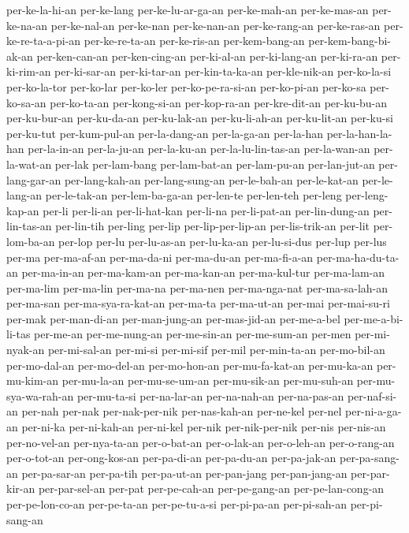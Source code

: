 {per-ke-la-hi-an per-ke-lang per-ke-lu-ar-ga-an per-ke-mah-an per-ke-mas-an
per-ke-na-an per-ke-nal-an per-ke-nan per-ke-nan-an per-ke-rang-an
per-ke-ras-an per-ke-re-ta-a-pi-an per-ke-re-ta-an per-ke-ris-an
per-kem-bang-an per-kem-bang-bi-ak-an per-ken-can-an per-ken-cing-an
per-ki-al-an per-ki-lang-an per-ki-ra-an per-ki-rim-an per-ki-sar-an
per-ki-tar-an per-kin-ta-ka-an per-kle-nik-an per-ko-la-si per-ko-la-tor
per-ko-lar per-ko-ler per-ko-pe-ra-si-an per-ko-pi-an per-ko-sa
per-ko-sa-an per-ko-ta-an per-kong-si-an per-kop-ra-an per-kre-dit-an
per-ku-bu-an per-ku-bur-an per-ku-da-an per-ku-lak-an per-ku-li-ah-an
per-ku-lit-an per-ku-si per-ku-tut per-kum-pul-an per-la-dang-an
per-la-ga-an per-la-han per-la-han-la-han per-la-in-an per-la-ju-an
per-la-ku-an per-la-lu-lin-tas-an per-la-wan-an per-la-wat-an per-lak
per-lam-bang per-lam-bat-an per-lam-pu-an per-lan-jut-an per-lang-gar-an
per-lang-kah-an per-lang-sung-an per-le-bah-an per-le-kat-an
per-le-lang-an per-le-tak-an per-lem-ba-ga-an per-len-te per-len-teh
per-leng per-leng-kap-an per-li per-li-an per-li-hat-kan per-li-na
per-li-pat-an per-lin-dung-an per-lin-tas-an per-lin-tih per-ling per-lip
per-lip-per-lip-an per-lis-trik-an per-lit per-lom-ba-an per-lop per-lu
per-lu-as-an per-lu-ka-an per-lu-si-dus per-lup per-lus per-ma
per-ma-af-an per-ma-da-ni per-ma-du-an per-ma-fi-a-an per-ma-ha-du-ta-an
per-ma-in-an per-ma-kam-an per-ma-kan-an per-ma-kul-tur per-ma-lam-an
per-ma-lim per-ma-lin per-ma-na per-ma-nen per-ma-nga-nat per-ma-sa-lah-an
per-ma-san per-ma-sya-ra-kat-an per-ma-ta per-ma-ut-an per-mai
per-mai-su-ri per-mak per-man-di-an per-man-jung-an per-mas-jid-an
per-me-a-bel per-me-a-bi-li-tas per-me-an per-me-nung-an per-me-sin-an
per-me-sum-an per-men per-mi-nyak-an per-mi-sal-an per-mi-si per-mi-sif
per-mil per-min-ta-an per-mo-bil-an per-mo-dal-an per-mo-del-an
per-mo-hon-an per-mu-fa-kat-an per-mu-ka-an per-mu-kim-an per-mu-la-an
per-mu-se-um-an per-mu-sik-an per-mu-suh-an per-mu-sya-wa-rah-an
per-mu-ta-si per-na-lar-an per-na-nah-an per-na-pas-an per-naf-si-an
per-nah per-nak per-nak-per-nik per-nas-kah-an per-ne-kel per-nel
per-ni-a-ga-an per-ni-ka per-ni-kah-an per-ni-kel per-nik per-nik-per-nik
per-nis per-nis-an per-no-vel-an per-nya-ta-an per-o-bat-an per-o-lak-an
per-o-leh-an per-o-rang-an per-o-tot-an per-ong-kos-an per-pa-di-an
per-pa-du-an per-pa-jak-an per-pa-sang-an per-pa-sar-an per-pa-tih
per-pa-ut-an per-pan-jang per-pan-jang-an per-par-kir-an per-par-sel-an
per-pat per-pe-cah-an per-pe-gang-an per-pe-lan-cong-an per-pe-lon-co-an
per-pe-ta-an per-pe-tu-a-si per-pi-pa-an per-pi-sah-an per-pi-sang-an
}
